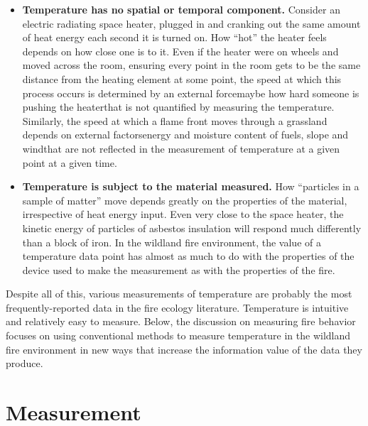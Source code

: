  \begin{itemize}[noitemsep]
 	\item \textbf{Temperature has no spatial or temporal component.} Consider an electric radiating space heater, plugged in and cranking out the same amount of heat energy each second it is turned on. 
 	How ``hot'' the heater feels depends on how close one is to it. 
 	Even if the heater were on wheels and moved across the room, ensuring every point in the room gets to be the same distance from the heating element at some point, the speed at which this process occurs is determined by an external force\textemdash maybe how hard someone is pushing the heater\textemdash that is not quantified by measuring the temperature. 
 	Similarly, the speed at which a flame front moves through a grassland depends on external factors\textemdash energy and moisture content of fuels, slope and wind\textemdash that are not reflected in the measurement of temperature at a given point at a given time. 
 	\item \textbf{Temperature is subject to the material measured.} How ``particles in a sample of matter'' move depends greatly on the properties of the material, irrespective of heat energy input. 
 	Even very close to the space heater, the kinetic energy of particles of asbestos insulation will respond much differently than a block of iron. 
 	In the wildland fire environment, the value of a temperature data point has almost as much to do with the properties of the device used to make the measurement as with the properties of the fire. 
\end{itemize}

Despite all of this, various measurements of temperature are probably the most frequently-reported data in the fire ecology literature. 
Temperature is intuitive and relatively easy to measure. 
Below, the discussion on measuring fire behavior focuses on using conventional methods to measure temperature in the wildland fire environment in new ways that increase the information value of the data they produce. 

\section{Measurement} 

